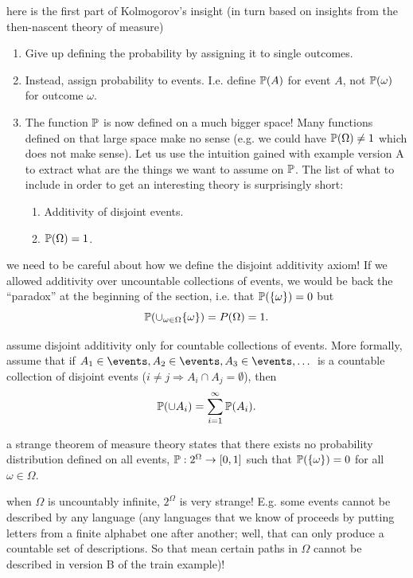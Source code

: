 \documentclass{article}
\begin{document}
 here is the first part of Kolmogorov's insight (in turn based on insights from the then-nascent theory of measure)
\begin{enumerate}
	\item Give up defining the probability by assigning it to single outcomes.
	\item Instead, assign probability to events. I.e. define $\P(A)$ for  event $A$, not $\P(\omega)$ for outcome $\omega$. 
	\item The function $\P$ is now defined on a much bigger space! Many functions defined on that large space make no sense (e.g. we could have $\P(\Omega) \neq 1$ which does not make sense). Let us use the intuition gained with example version A to extract what are the things we want to assume on $\P$. The list of what to include in order to get an interesting theory is surprisingly short:
	\begin{enumerate}
		\item Additivity of disjoint events.
		\item $\P(\Omega) = 1$.
	\end{enumerate}
\end{enumerate}

 we need to be careful about how we define the disjoint additivity axiom! If we allowed additivity over uncountable collections of events, we would be back the ``paradox'' at the beginning of the section, i.e. that $\P(\{\omega\}) = 0$ but \[ \P(\cup_{\omega \in \Omega} \{\omega\}) = P(\Omega) = 1. \]

 assume disjoint additivity only for countable collections of events. More formally, assume that if $A_1 \in \events, A_2 \in \events, A_3 \in \events, \dots$ is a countable collection of disjoint events ($i\neq j \Longrightarrow A_i \cap A_j = \emptyset$), then 
\[ \P(\cup A_i) = \sum_{i=1}^{\infty} \P(A_i). \]

 a strange theorem of measure theory states that there exists no probability distribution defined on all events, $\P:2^\Omega \to [0, 1]$ such that $\P(\{\omega\}) = 0$ for all $\omega \in \Omega$.

 when $\Omega$ is uncountably infinite, $2^\Omega$ is very strange! E.g. some events cannot be described by any language (any languages that we know of proceeds by putting letters from a finite alphabet one after another; well, that can only produce a countable set of descriptions. So that mean certain paths in $\Omega$ cannot be described in  version B of the train example)! 
\end{document}
